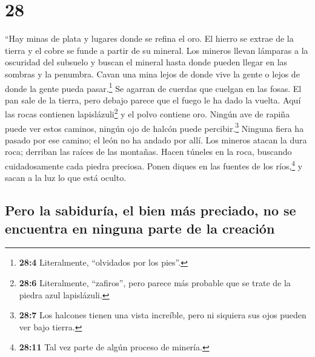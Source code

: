 \hypertarget{section-27}{%
\section{28}\label{section-27}}

 ``Hay minas de plata y lugares donde se refina el oro.
 El hierro se extrae de la tierra y el cobre se funde a
partir de su mineral.  Los mineros llevan lámparas a la
oscuridad del subsuelo y buscan el mineral hasta donde pueden llegar en
las sombras y la penumbra.  Cavan una mina lejos de donde
vive la gente o lejos de donde la gente pueda pasar.\footnote{\textbf{28:4}
  Literalmente, ``olvidados por los pies''.} Se agarran de cuerdas que
cuelgan en las fosas.  El pan sale de la tierra, pero
debajo parece que el fuego le ha dado la vuelta.  Aquí las
rocas contienen lapislázuli\footnote{\textbf{28:6} Literalmente,
  ``zafiros'', pero parece más probable que se trate de la piedra azul
  lapislázuli.} y el polvo contiene oro.  Ningún ave de
rapiña puede ver estos caminos, ningún ojo de halcón puede
percibir.\footnote{\textbf{28:7} Los halcones tienen una vista
  increíble, pero ni siquiera sus ojos pueden ver bajo tierra.}
 Ninguna fiera ha pasado por ese camino; el león no ha
andado por allí.  Los mineros atacan la dura roca;
derriban las raíces de las montañas.  Hacen túneles en la
roca, buscando cuidadosamente cada piedra preciosa. 
Ponen diques en las fuentes de los ríos,\footnote{\textbf{28:11} Tal vez
  parte de algún proceso de minería.} y sacan a la luz lo que está
oculto.

\hypertarget{pero-la-sabiduruxeda-el-bien-muxe1s-preciado-no-se-encuentra-en-ninguna-parte-de-la-creaciuxf3n}{%
\subsection{Pero la sabiduría, el bien más preciado, no se encuentra en
ninguna parte de la
creación}\label{pero-la-sabiduruxeda-el-bien-muxe1s-preciado-no-se-encuentra-en-ninguna-parte-de-la-creaciuxf3n}}

